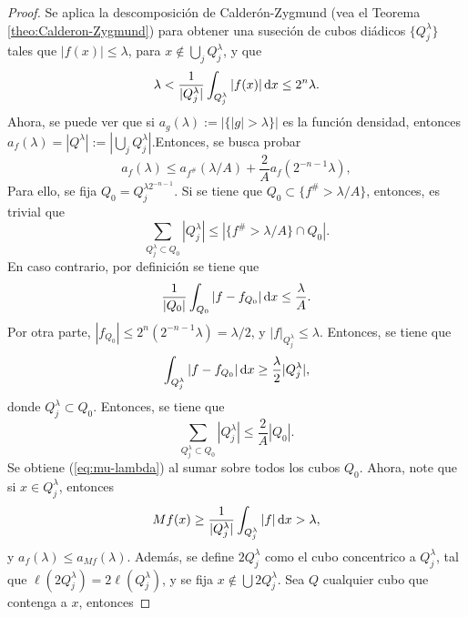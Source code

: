 \begin{proof}
	Se aplica la descomposición de Calderón-Zygmund (vea el Teorema \ref{theo:Calderon-Zygmund}) para obtener una suseción de cubos diádicos $\{Q_j^\lambda\}$ tales que $|f(x)| \leq \lambda$, para $x\notin\bigcup_j Q_j^\lambda$, y que 
	\begin{equation*}
		\lambda < \frac{1}{|Q_j^\lambda|} \int_{Q_j^\lambda} |f(x)|\mathop{}\!\mathrm{d} x \leq 2^n\lambda.
	\end{equation*}
	Ahora, se puede ver que si $a_g(\lambda) := |\{|g|>\lambda\}|$ es la función densidad, entonces $a_{f}(\lambda) = |Q^\lambda| := \left|\bigcup_j Q_j^\lambda \right|$.Entonces, se busca probar
	\begin{equation}\label{eq:mu-lambda}
		a_{f}(\lambda) \leq a_{f^\#}(\lambda/A) + \frac{2}{A}a_{f}(2^{-n-1}\lambda),
	\end{equation}
	Para ello, se fija $Q_0 = Q_j^{\lambda2^{-n-1}}$. Si se tiene que $Q_0 \subset\{f^\#>\lambda/A\}$, entonces, es trivial que 
	\begin{equation*}
		\sum_{Q_j^\lambda \subset Q_0} |Q_j^\lambda| \leq |\{f^\# > \lambda/A\}\cap Q_0|.
	\end{equation*}
	En caso contrario, por definición se tiene que 
	\begin{equation*}
		\frac{1}{|Q_0|} \int_{Q_0} |f - f_{Q_0}| \mathop{}\!\mathrm{d} x \leq \frac{\lambda}{A}.
	\end{equation*}
	Por otra parte, $|f_{Q_0}| \leq 2^n(2^{-n-1}\lambda) = \lambda/2$, y $|f|_{Q_j^\lambda} \leq \lambda$. Entonces, se tiene que 
	\begin{equation*}
		\int_{Q_j^\lambda} |f - f_{Q_0}| \mathop{}\!\mathrm{d} x \geq \frac{\lambda}{2} |Q_j^\lambda|,
	\end{equation*}
	donde $Q_j^\lambda\subset Q_0$. Entonces, se tiene que 
	\begin{equation*}
		\sum_{Q_j^\lambda\subset Q_0} |Q_j^\lambda| \leq \frac{2}{A}|Q_0|.
	\end{equation*}
	Se obtiene (\ref{eq:mu-lambda}) al sumar sobre todos los cubos $Q_0$. Ahora, note que si $x\in Q_j^\lambda$, entonces 
	\begin{equation*}
		Mf(x) \geq \frac{1}{|Q_j^\lambda|} \int_{Q_j^\lambda} |f|\mathop{}\!\mathrm{d} x > \lambda,
	\end{equation*}
	y $a_{f}(\lambda) \leq a_{Mf}(\lambda)$. Además, se define $2Q_j^\lambda$ como el cubo concentrico a $Q_j^\lambda$, tal que $\ell(2Q_j^\lambda) = 2\ell(Q_j^\lambda)$, y se fija $x\notin\bigcup 2Q_j^\lambda$. Sea $Q$ cualquier cubo que contenga a $x$, entonces

\end{proof}
